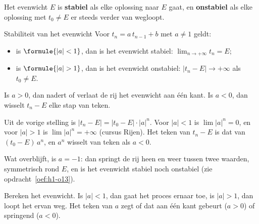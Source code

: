 \begin{theorie}
Het evenwicht $E$ is \textbf{\textcolor{accent}{stabiel}} als elke oplossing naar $E$ gaat, en \textbf{\textcolor{accent}{onstabiel}} als elke oplossing met $t_0 \neq E$ er steeds verder van wegloopt.

\begin{stelling}{Stabiliteit van het evenwicht}
Voor $t_n = a\, t_{n-1} + b$ met $a \neq 1$ geldt:
\begin{itemize}
\item is $\formule{|a| < 1}$, dan is het evenwicht stabiel: $\displaystyle\lim_{n \to +\infty} t_n = E$;
\item is $\formule{|a| > 1}$, dan is het evenwicht onstabiel: $|t_n - E| \to +\infty$ als $t_0 \neq E$.
\end{itemize}
Is $a > 0$, dan nadert of verlaat de rij het evenwicht aan één kant. Is $a < 0$, dan wisselt $t_n - E$ elke stap van teken.
\end{stelling}

\begin{bewijs}
Uit de vorige stelling is $|t_n - E| = |t_0 - E| \cdot |a|^n$. Voor $|a| < 1$ is $\lim |a|^n = 0$, en voor $|a| > 1$ is $\lim |a|^n = +\infty$ (cursus Rijen). Het teken van $t_n - E$ is dat van $(t_0 - E)\,a^n$, en $a^n$ wisselt van teken als $a < 0$.
\end{bewijs}
\end{theorie}

Wat overblijft, is $a = -1$: dan springt de rij heen en weer tussen twee waarden, symmetrisch rond $E$, en is het evenwicht stabiel noch onstabiel (zie opdracht~\ref{oef:h1-o13}).


\begin{werkwijze}
Bereken het evenwicht. Is $|a| < 1$, dan gaat het proces ernaar toe, is $|a| > 1$, dan loopt het ervan weg. Het teken van $a$ zegt of dat aan één kant gebeurt ($a > 0$) of springend ($a < 0$).
\end{werkwijze}

